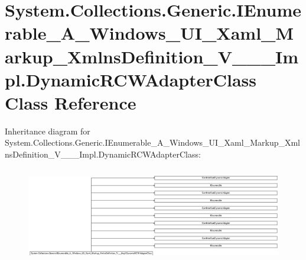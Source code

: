 \hypertarget{class_system_1_1_collections_1_1_generic_1_1_i_enumerable___a___windows___u_i___xaml___markup___afc618fe48e58025f7c7cf6a937818bc}{}\section{System.\+Collections.\+Generic.\+I\+Enumerable\+\_\+\+A\+\_\+\+Windows\+\_\+\+U\+I\+\_\+\+Xaml\+\_\+\+Markup\+\_\+\+Xmlns\+Definition\+\_\+\+V\+\_\+\+\_\+\+\_\+\+Impl.\+Dynamic\+R\+C\+W\+Adapter\+Class Class Reference}
\label{class_system_1_1_collections_1_1_generic_1_1_i_enumerable___a___windows___u_i___xaml___markup___afc618fe48e58025f7c7cf6a937818bc}
Inheritance diagram for System.\+Collections.\+Generic.\+I\+Enumerable\+\_\+\+A\+\_\+\+Windows\+\_\+\+U\+I\+\_\+\+Xaml\+\_\+\+Markup\+\_\+\+Xmlns\+Definition\+\_\+\+V\+\_\+\+\_\+\+\_\+\+Impl.\+Dynamic\+R\+C\+W\+Adapter\+Class\+:\begin{figure}[H]
\begin{center}
\leavevmode
\includegraphics[height=4.190476cm]{class_system_1_1_collections_1_1_generic_1_1_i_enumerable___a___windows___u_i___xaml___markup___afc618fe48e58025f7c7cf6a937818bc}
\end{center}
\end{figure}
